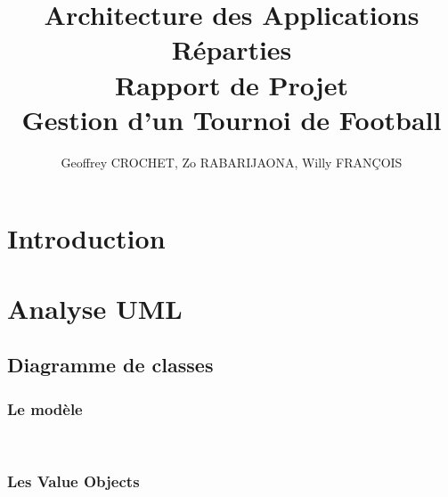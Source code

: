 \documentclass[10pt]{report}
\title{Architecture des Applications Réparties\\ Rapport de Projet\\ Gestion d'un Tournoi de Football}
\author{Geoffrey CROCHET, Zo RABARIJAONA, Willy FRANÇOIS}
\begin{document}
\maketitle


\newpage

\tableofcontents


\newpage
\chapter*{Introduction}

\chapter{Analyse UML}
\section{Diagramme de classes}
\subsection{Le modèle}
	\begin{figure}[here]
	      \begin{center}	      
	      \end{center}
	\end{figure}
~~\\
\subsection{Les Value Objects}
\end{document}
